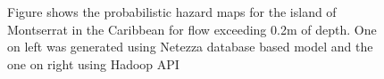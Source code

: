 \documentclass{acm_proc_article-sp}
\begin{document}
\begin{figure}
\begin{center}
%
%
\caption {Figure shows the probabilistic hazard maps for the island of Montserrat in the Caribbean for flow exceeding 0.2m of depth.
One on left was generated using Netezza database based model and the one on right using Hadoop API} \label{map2}
\label{maps}
\end{center}
\end{figure}
\end{document}
